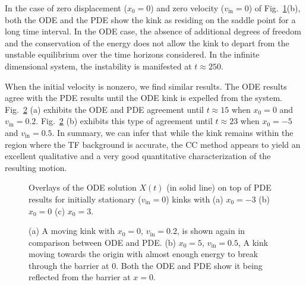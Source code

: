 \documentclass[vecphys]{svmult}		%
\begin{document}
In the case of  zero displacement ($x_0=0$) and zero velocity
($v_\mathrm{in}=0$) of Fig.~\ref{ODE_PDE_single}(b), both the ODE and the PDE show the kink
as residing on the saddle point for a long time interval. In the
ODE case, the absence of additional degrees of freedom and the conservation
of the energy does not allow the kink to depart from the unstable
equilibrium over the time horizons considered. In the infinite dimensional
system, the instability is manifested at $t \approx 250$.


When the initial velocity is nonzero, we find similar results. The
ODE results agree with the PDE results until the ODE kink is expelled from the system.  Fig.~\ref{ODE_PDE_single2} (a) exhibits the ODE and PDE agreement until $t\approx 15$ when $x_0=0$ and $v_\mathrm{in}=0.2$. Fig.~\ref{ODE_PDE_single2} (b) exhibits this type of agreement until $t\approx 23$ when $x_0=-5$ and $v_\mathrm{in}=0.5$. In summary, we can infer that while the kink remains within the
region where the TF background is accurate, the CC method appears to yield an excellent qualitative
and a very good quantitative characterization of the resulting motion.

\begin{figure}[tbp]
\begin{center}
  \end{center}
    \caption{ Overlays of the ODE solution $X(t)$ (in solid line) on top of PDE results for initially stationary ($v_\mathrm{in}=0$) kinks with (a) $x_0 = -3$ (b) $x_0=0$ (c) $x_0=3$. }
\label{ODE_PDE_single}
\end{figure}


\begin{figure}[tbp]
\begin{center}
  \end{center}
    \caption{ (a) A moving kink with $x_0=0$, $v_\mathrm{in}=0.2$, is
    shown again in comparison between ODE and PDE. (b) $x_0=5$, $v_\mathrm{in}=0.5$, A kink moving towards the origin with almost enough
    energy to break through the barrier at $0$. Both the ODE and PDE
    show it being reflected from the barrier at $x=0$. }
\label{ODE_PDE_single2}
\end{figure}
\end{document}
